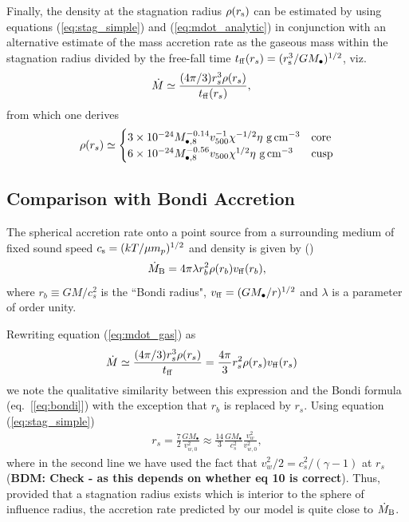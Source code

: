 \documentclass[usenatbib,fleqn]{mn2e}
\newcommand{\rs}{r_s}
\newcommand{\rb}{r_b}
\newcommand{\Mbh}[1][]{M_{\bullet#1}}
\newcommand{\Mbheight}{M_{\bullet,8}}
\newcommand{\ff}{\rm ff}
\newcommand{\vwO}{v_{w,0}}
\begin{document}
Finally, the density at the stagnation radius $\rho(r_{\rm s})$ can be estimated by using equations (\ref{eq:stag_simple}) and (\ref{eq:mdot_analytic}) in conjunction with an alternative estimate of the mass accretion rate as the gaseous mass within the stagnation radius divided by the free-fall time $t_{\rm ff}(\rs) = (r_{\rm s}^{3}/GM_{\bullet})^{1/2}$, viz.
\begin{align}
  &\dot{M}\simeq\frac{(4 \pi/3) \rs^3 \rho(\rs)}{t_{\ff}(\rs)},
  \label{eq:mdot_gas}
\end{align}
from which one derives 
\begin{align}
  \rho(\rs)\simeq
  \begin{cases}
    3 \times 10^{-24} \Mbheight^{-0.14} v_{500}^{-1} \chi^{-1/2} \eta \,
    \, {\rm g \, cm^{-3}}& \text{core}\\
    6 \times 10^{-24}  \Mbheight^{-0.56} v_{500}  \chi^{1/2}  \eta \,\, {\rm g \,cm^{-3}} & \text{cusp}
  \end{cases}
  \label{eq:rhors}
\end{align}


\subsection{Comparison with Bondi Accretion}
The spherical accretion rate onto a point source from a surrounding medium of fixed sound speed $c_{\rm s} = (kT/\mu m_p)^{1/2}$ and density is given by (\citealt{Bondi52}) 
\begin{align}
  \dot{M}_{\rm B} =4\pi \lambda r_b^2 \rho(r_b) v_{\rm ff}(r_b),
\label{eq:bondi}
\end{align}
where $r_b \equiv GM/c_{s}^{2}$ is the ``Bondi radius", $v_{\rm ff} = (GM_{\bullet}/r)^{1/2}$ and $\lambda$ is a parameter of order unity.  

Rewriting equation (\ref{eq:mdot_gas}) as
\begin{align}
  &\dot{M}\simeq\frac{(4 \pi/3) \rs^3 \rho(\rs)}{t_{\ff}} =\frac{4 \pi}{3} \rs^2 \rho(\rs) v_{\ff}(\rs)
\end{align}
we note the qualitative similarity between this expression and the Bondi formula (eq.~[\ref{eq:bondi}]) with the exception that $\rb$ is replaced by $\rs$.  Using equation (\ref{eq:stag_simple})
\begin{align}
  \rs=\frac{7}{2}\frac{G \Mbh}{\vwO^2} \approx \frac{14}{3}\frac{GM_{\bullet}}{c_{s}^{2}}\frac{v_{w}^{2}}{v_{w,0}^{2}},
  \label{eq:rs_simple}
\end{align}
where in the second line we have used the fact that $v_{w}^{2}/2 = c_s^2/(\gamma-1)$ at $\rs$ ({\bf BDM: Check - as this depends on whether eq 10 is correct}).  Thus, provided that a stagnation radius exists which is interior to the sphere of influence radius, the accretion rate predicted by our model is quite close to $\dot{M}_{\rm B}$.
\end{document}
